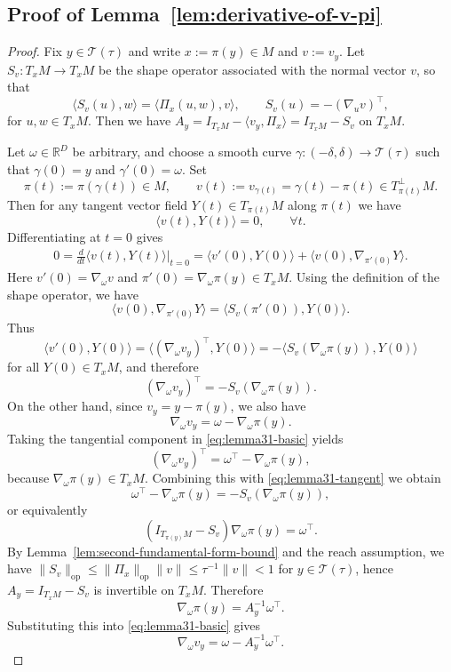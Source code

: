 \documentclass[11pt]{article}
\theoremstyle{plain}
\theoremstyle{definition}
\begin{document}
\subsection{Proof of Lemma~\ref{lem:derivative-of-v-pi}}\label{sec:pf-derivative of v pi}
\begin{proof}
Fix $y \in \mathcal T(\tau)$ and write $x := \pi(y) \in M$ and $v := v_y$. Let $S_v \colon T_xM \to T_xM$ be the shape operator associated with the normal vector $v$, so that 
\[
\langle S_v (u), w \rangle = \langle \Pi_x(u,w), v \rangle, \qquad S_v(u) = -(\nabla_u v)^\top,
\]
for $u,w\in T_xM$. Then we have $A_y = I_{T_xM} - \langle v_y,\Pi_{x}\rangle = I_{T_xM} - S_v$ on $T_xM$.

Let $\omega \in \mathbb{R}^D$ be arbitrary, and choose a smooth curve $\gamma \colon (-\delta,\delta) \to \mathcal T(\tau)$ such that $\gamma(0) = y$ and $\gamma'(0) = \omega$. Set
\[
\pi(t) := \pi(\gamma(t)) \in M, \qquad v(t) := v_{\gamma(t)} = \gamma(t) - \pi(t)
\in T_{\pi(t)}^\perp M.
\]
Then for any tangent vector field $Y(t) \in T_{\pi(t)}M$ along $\pi(t)$ we have
\[
\langle v(t), Y(t) \rangle = 0, \qquad \forall t.
\]
Differentiating at $t=0$ gives
\begin{align*}
0 
= \frac{d}{dt} \langle v(t), Y(t) \rangle \Big|_{t=0} 
= \langle v'(0), Y(0) \rangle
   + \langle v(0), \nabla_{\pi'(0)} Y \rangle.
\end{align*}
Here $v'(0) = \nabla_\omega v$ and $\pi'(0) = \nabla_\omega \pi(y) \in T_xM$.
Using the definition of the shape operator, we have
\[
\langle v(0), \nabla_{\pi'(0)} Y \rangle
= \langle S_v(\pi'(0)), Y(0) \rangle.
\]
Thus
\[
\langle v'(0), Y(0) \rangle = \langle (\nabla_\omega v_y)^\top, Y(0) \rangle
= - \langle S_v(\nabla_\omega \pi(y)), Y(0) \rangle
\]
for all $Y(0) \in T_xM$, and therefore
\begin{equation}\label{eq:lemma31-tangent}
(\nabla_\omega v_y)^\top = - S_v(\nabla_\omega \pi(y)).
\end{equation}
On the other hand, since $v_y = y - \pi(y)$, we also have
\begin{equation}\label{eq:lemma31-basic}
\nabla_\omega v_y = \omega - \nabla_\omega \pi(y).
\end{equation}
Taking the tangential component in \eqref{eq:lemma31-basic} yields
\[
(\nabla_\omega v_y)^\top = \omega^\top - \nabla_\omega \pi(y),
\]
because $\nabla_\omega \pi(y) \in T_xM$. Combining this with \eqref{eq:lemma31-tangent} we obtain
\[
\omega^\top - \nabla_\omega \pi(y) = - S_v(\nabla_\omega \pi(y)),
\]
or equivalently
\[
(I_{T_{\pi(y)}M} - S_v)\nabla_\omega \pi(y) = \omega^\top.
\]
By Lemma~\ref{lem:second-fundamental-form-bound} and the reach assumption, we have $\|S_v\|_{\mathrm{op}} \le \| \Pi_x\|_{\mathrm{op}} \|v\| \le \tau^{-1}\|v\| < 1$ for $y \in \mathcal T(\tau)$, hence $A_y = I_{T_xM}- S_v$ is invertible on $T_xM$. Therefore
\[
\nabla_\omega \pi(y) = A_y^{-1} \omega^\top.
\]
Substituting this into \eqref{eq:lemma31-basic} gives
\[
\nabla_\omega v_y = \omega - A_y^{-1}\omega^\top.
\]
\end{proof}
\end{document}
